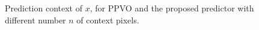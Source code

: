 \documentclass[review,3p,10pt,sort&compress]{elsarticle}
\begin{document}
\begin{figure}
\qquad\qquad
{}		
\centering
\caption{Prediction context of $x$, for PPVO and the proposed predictor with different number $n$ of context pixels.}
\label{Fig.Context}
\end{figure}
\end{document}
